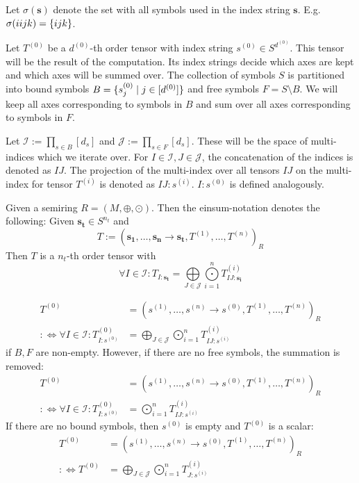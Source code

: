 \begin{definition}
    Let $\sigma(\bm{s})$ denote the set with all symbols used in the index string $\bm{s}$.
    E.g. $\sigma(iijk) = \lbrace ijk \rbrace$.

    Let $T^{(0)}$ be a $d^{(0)}$-th order tensor with index string $s^{(0)} \in S^{d^{(0)}}$.
    This tensor will be the result of the computation.
    Its index strings decide which axes are kept and which axes will be summed over.
    The collection of symbols $S$ is partitioned into bound symbols $B = \lbrace s^{(0)}_j \mid j \in [d^{(0)}] \rbrace$ and  free symbols $F = S \setminus B$.
    We will keep all axes corresponding to symbols in $B$ and sum over all axes corresponding to symbols in $F$.

    Let $\mathcal{I} := \prod_{s \in B} [d_s]$ and $\mathcal{J} := \prod_{s \in F} [d_s]$.
    These will be the space of multi-indices which we iterate over.
    For $I \in \mathcal{I}, J \in \mathcal{J}$, the concatenation of the indices is denoted as $IJ$.
    The projection of the multi-index over all tensors $IJ$ on the multi-index for tensor $T^{(i)}$ is denoted as $IJ:s^{(i)}$.
    $I:s^{(0)}$ is defined analogously.

    Given a semiring $R = (M, \oplus, \odot)$. Then the einsum-notation denotes the following:
    Given $\bm{s_t} \in S^{n_t}$ and
    $$T := (\bm{s_1},\dots,\bm{s_n} \rightarrow \bm{s_t}, T^{(1)},\dots,T^{(n)})_R$$
    Then $T$ is a $n_t$-th order tensor with
    $$\forall I \in \mathcal{I}: T_{I : \bm{s_t}} = \bigoplus\limits_{J \in \mathcal{J}} \bigodot\limits_{i = 1}^{n} T^{(i)}_{IJ : \bm{s_i}}$$

    \begin{align*}
        T^{(0)}                                               & = (s^{(1)},\dots,s^{(n)} \rightarrow s^{(0)}, T^{(1)},\dots,T^{(n)})_R                  \\
        :\iff \forall I \in \mathcal{I}: T^{(0)}_{I: s^{(0)}} & = \bigoplus\limits_{J \in \mathcal{J}} \bigodot\limits_{i = 1}^{n} T^{(i)}_{IJ:s^{(i)}}
    \end{align*}
    if $B,F$ are non-empty. However, if there are no free symbols, the summation is removed:
    \begin{align*}
        T^{(0)}                                               & = (s^{(1)},\dots,s^{(n)} \rightarrow s^{(0)}, T^{(1)},\dots,T^{(n)})_R \\
        :\iff \forall I \in \mathcal{I}: T^{(0)}_{I: s^{(0)}} & = \bigodot\limits_{i = 1}^{n} T^{(i)}_{IJ:s^{(i)}}
    \end{align*}
    If there are no bound symbols, then $s^{(0)}$ is empty and $T^{(0)}$ is a scalar:
    \begin{align*}
        T^{(0)}       & = (s^{(1)},\dots,s^{(n)} \rightarrow s^{(0)}, T^{(1)},\dots,T^{(n)})_R                 \\
        :\iff T^{(0)} & = \bigoplus\limits_{J \in \mathcal{J}} \bigodot\limits_{i = 1}^{n} T^{(i)}_{J:s^{(i)}}
    \end{align*}


\end{definition}
